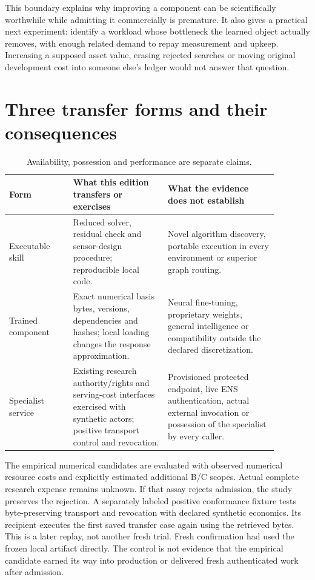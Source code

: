 \documentclass[11pt,letterpaper]{article}
\begin{document}
This boundary explains why improving a component can be scientifically worthwhile while admitting it commercially is premature. It also gives a practical next experiment: identify a workload whose bottleneck the learned object actually removes, with enough related demand to repay measurement and upkeep. Increasing a supposed asset value, erasing rejected searches or moving original development cost into someone else's ledger would not answer that question.

\section{Three transfer forms and their consequences}

\begin{table}[htbp]\centering\small
\begin{tabular}{p{0.21\linewidth}p{0.31\linewidth}p{0.36\linewidth}}
\toprule
Form & What this edition transfers or exercises & What the evidence does not establish \\
\midrule
Executable skill & Reduced solver, residual check and sensor-design procedure; reproducible local code. & Novel algorithm discovery, portable execution in every environment or superior graph routing. \\
Trained component & Exact numerical basis bytes, versions, dependencies and hashes; local loading changes the response approximation. & Neural fine-tuning, proprietary weights, general intelligence or compatibility outside the declared discretization. \\
Specialist service & Existing research authority/rights and serving-cost interfaces exercised with synthetic actors; positive transport control and revocation. & Provisioned protected endpoint, live ENS authentication, actual external invocation or possession of the specialist by every caller. \\
\bottomrule
\end{tabular}
\caption{Availability, possession and performance are separate claims.}
\end{table}

The empirical numerical candidates are evaluated with observed numerical resource costs and explicitly estimated additional B/C scopes. Actual complete research expense remains unknown. If that assay rejects admission, the study preserves the rejection. A separately labeled positive conformance fixture tests byte-preserving transport and revocation with declared synthetic economics. Its recipient executes the first saved transfer case again using the retrieved bytes. This is a later replay, not another fresh trial. Fresh confirmation had used the frozen local artifact directly. The control is not evidence that the empirical candidate earned its way into production or delivered fresh authenticated work after admission.
\end{document}
